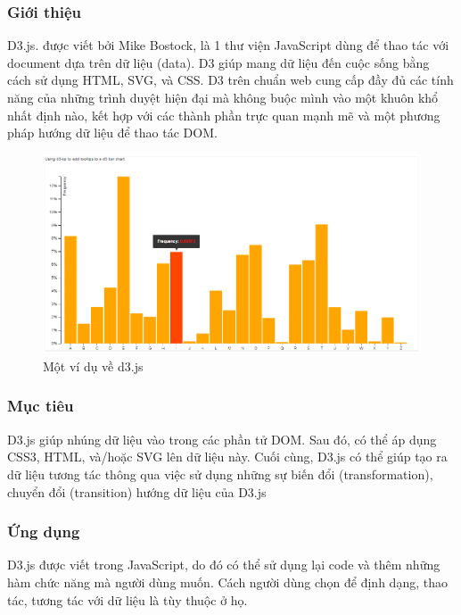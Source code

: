 \documentclass[12pt,a4paper]{article}
\begin{document}
\subsubsection{Giới thiệu}
D3.js\cite{d3jsintro1}. được viết bởi Mike Bostock, là 1 thư viện JavaScript dùng để thao tác với document dựa trên dữ liệu (data). D3 giúp mang dữ liệu đến cuộc sống bằng cách sử dụng HTML, SVG, và CSS. D3 trên chuẩn web cung cấp đầy đủ các tính năng của những trình duyệt hiện đại mà không buộc mình vào một khuôn khổ nhất định nào, kết hợp với các thành phần trực quan mạnh mẽ và một phương pháp hướng dữ liệu để thao tác DOM.

\begin{center}
    \begin{figure}[htp]
    \begin{center}
     \includegraphics[scale=.6]{image/d3}
    \end{center}
    \caption{Một ví dụ về d3.js}
    \label{refhinh14}
    \end{figure}
\end{center}

\subsubsection{Mục tiêu}
D3.js giúp nhúng dữ liệu vào trong các phần tử DOM. Sau đó, có thể áp dụng CSS3, HTML, và/hoặc SVG lên dữ liệu này. Cuối cùng, D3.js có thể giúp tạo ra dữ liệu tương tác thông qua việc sử dụng những sự biến đổi (transformation), chuyển đổi (transition) hướng dữ liệu của D3.js

\subsubsection{Ứng dụng}
D3.js được viết trong JavaScript, do đó có thể sử dụng lại code và thêm những hàm chức năng mà người dùng muốn. Cách người dùng chọn để định dạng, thao tác, tương tác với dữ liệu là tùy thuộc ở họ.\citep{d3jsintro2}
\end{document}
